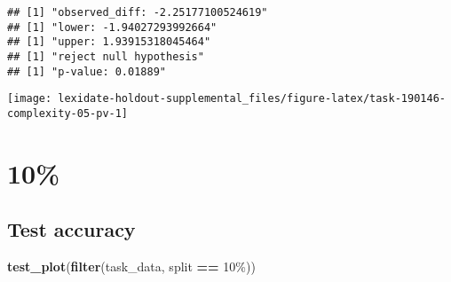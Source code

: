 \documentclass[
]{book}
\newenvironment{Shaded}{\begin{snugshade}}{\end{snugshade}}
\newcommand{\AttributeTok}[1]{\textcolor[rgb]{0.13,0.29,0.53}{#1}}
\newcommand{\DecValTok}[1]{\textcolor[rgb]{0.00,0.00,0.81}{#1}}
\newcommand{\FunctionTok}[1]{\textcolor[rgb]{0.13,0.29,0.53}{\textbf{#1}}}
\newcommand{\NormalTok}[1]{#1}
\newcommand{\OtherTok}[1]{\textcolor[rgb]{0.56,0.35,0.01}{#1}}
\newcommand{\SpecialCharTok}[1]{\textcolor[rgb]{0.81,0.36,0.00}{\textbf{#1}}}
\newcommand{\StringTok}[1]{\textcolor[rgb]{0.31,0.60,0.02}{#1}}
\begin{document}
\begin{Shaded}
\end{Shaded}

\begin{verbatim}
## [1] "observed_diff: -2.25177100524619"
## [1] "lower: -1.94027293992664"
## [1] "upper: 1.93915318045464"
## [1] "reject null hypothesis"
## [1] "p-value: 0.01889"
\end{verbatim}

\texttt{[image: lexidate-holdout-supplemental\_files/figure-latex/task-190146-complexity-05-pv-1]}

\hypertarget{section-16}{%
\section{10\%}\label{section-16}}

\hypertarget{test-accuracy-16}{%
\subsection{Test accuracy}\label{test-accuracy-16}}

\begin{Shaded}
\begin{Highlighting}[]
\FunctionTok{test\_plot}\NormalTok{(}\FunctionTok{filter}\NormalTok{(task\_data, split }\SpecialCharTok{==} \StringTok{\textquotesingle{}10\%\textquotesingle{}}\NormalTok{))}
\end{Highlighting}
\end{Shaded}
\end{document}
